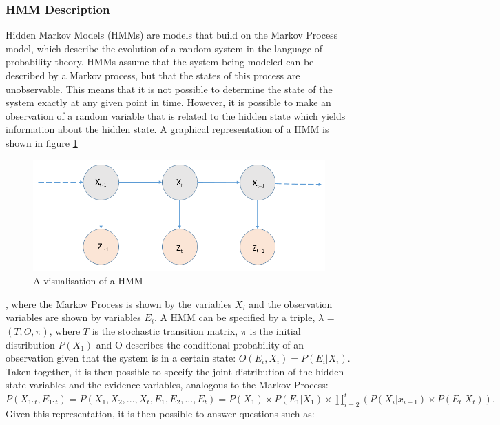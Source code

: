 \subsubsection{HMM Description}\label{subsubsec:HMMDesc}
Hidden Markov Models (HMMs) are models that build on the Markov Process model, which describe the evolution of a random system in the language of probability theory. HMMs assume that the system being modeled can be described by a Markov process, but that the states of this process are unobservable. This means that it is not possible to determine the state of the system exactly at any given point in time. However, it is possible to make an observation of a random variable that is related to the hidden state which yields information about the hidden state. A graphical representation of a HMM is shown in figure \ref{fig:hmm}
\begin{figure}[]
    \centering
    \includegraphics[width=0.8\linewidth]{Chapters/BackgroundKnowledgeAndRelatedWork/MultiAgentTargetDetectionBackground/Figs/HMMs/HMMObservationsOnly.png}
    \caption{A visualisation of a HMM \cite{AIAMA}}
    \label{fig:hmm}
\end{figure}
, where the Markov Process is shown by the variables $X_i$ and the observation variables are shown by variables $E_i$. A HMM can be specified by a triple, $\lambda$ = $(T, O, \pi)$, where $T$ is the stochastic transition matrix, $\pi$ is the initial distribution $P(X_1)$ and O describes the conditional probability of an observation given that the system is in a certain state: $O(E_i, X_i) = P(E_{i} | X_{i})$. Taken together, it is then possible to specify the joint distribution of the hidden state variables and the evidence variables, analogous to the Markov Process: 
$
P(X_{1:t}, E_{1:t}) = P(X_1, X_2, ..., X_t, E_1, E_2, ..., E_t) = P(X_1) \times P(E_1 | X_1) \times
\prod_{i=2}^{t}{(P(X_i | x_{i-1}) \times P(E_t | X_t))}.
$Given this representation, it is then possible to answer questions such as:
